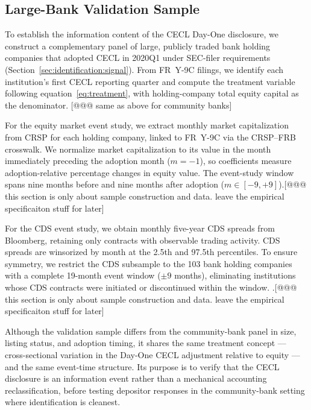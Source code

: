 \subsection{Large-Bank Validation Sample}
\label{sec:data:validation}

To establish the information content of the CECL Day-One disclosure, we
construct a complementary panel of large, publicly traded bank holding companies
that adopted CECL in 2020Q1 under SEC-filer requirements
(Section~\ref{sec:identification:signal}). From FR~Y-9C filings, we identify
each institution's first CECL reporting quarter and compute the treatment variable
following equation~\eqref{eq:treatment}, with holding-company total equity capital
as the denominator. [@@@ same as above for community banks]

For the equity market event study, we extract monthly market capitalization from
CRSP for each holding company, linked to FR~Y-9C via the CRSP--FRB crosswalk.
We normalize market capitalization to its value in the month immediately
preceding the adoption month ($m = -1$), so coefficients measure
adoption-relative percentage changes in equity value. The event-study window
spans nine months before and nine months after adoption ($m \in [-9, +9]$).[@@@ this section is only about sample construction and data. leave the empirical specificaiton stuff for later]

For the CDS event study, we obtain monthly five-year CDS spreads from Bloomberg,
retaining only contracts with observable trading activity. CDS spreads are
winsorized by month at the 2.5th and 97.5th percentiles. To ensure symmetry,
we restrict the CDS subsample to the 103 bank holding companies with a
complete 19-month event window ($\pm 9$ months), eliminating institutions
whose CDS contracts were initiated or discontinued within the window. .[@@@ this section is only about sample construction and data. leave the empirical specificaiton stuff for later]

Although the validation sample differs from the community-bank panel in size,
listing status, and adoption timing, it shares the same treatment concept ---
cross-sectional variation in the Day-One CECL adjustment relative to equity ---
and the same event-time structure. Its purpose is to verify that the CECL
disclosure is an information event rather than a mechanical accounting
reclassification, before testing depositor responses in the community-bank setting
where identification is cleanest.
